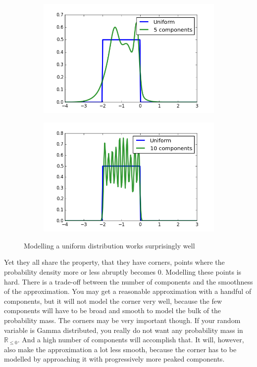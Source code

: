 \documentclass[11pt,a4paper]{book}
\begin{document}
\begin{figure}[h]
  \centering
  \begin{subfigure}{0.45\textwidth}
    \centering
    \includegraphics[width=\textwidth]{thesis/em/uniform-5-components}
  \end{subfigure}
  \hfill
  \begin{subfigure}{0.45\textwidth}
    \centering
    \includegraphics[width=\textwidth]{thesis/em/uniform-10-components}
  \end{subfigure}
  \caption{Modelling a uniform distribution works surprisingly well}
  \label{fig:em-uniform}
\end{figure}

Yet they all share the property, that they have corners, points where the
probability density more or less abruptly becomes $0$. Modelling these points is
hard. There is a trade-off between the number of components and the smoothness
of the approximation. You may get a reasonable approximation with a handful of
components, but it will not model the corner very well, because the few
components will have to be broad and smooth to model the bulk of the probability
mass. The corners may be very important though. If your random variable is Gamma
distributed, you really do not want any probability mass in
$\mathbb{R}_{\le 0}$. And a high number of components will accomplish that. It
will, however, also make the approximation a lot less smooth, because the corner
has to be modelled by approaching it with progressively more peaked components.
\end{document}
